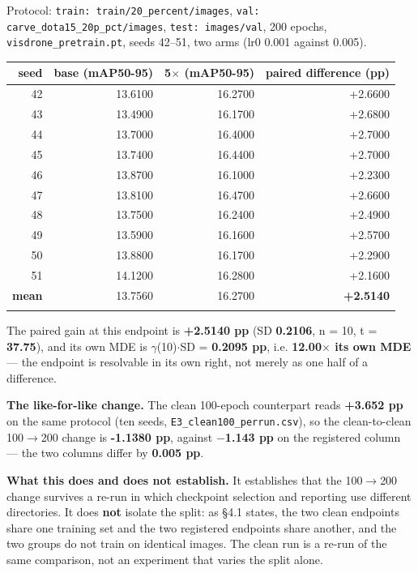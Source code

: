 \documentclass[pdflatex,sn-mathphys-ay]{sn-jnl}
\begin{document}
Protocol: \texttt{train: train/20\_percent/images}, \texttt{val: carve\_dota15\_20p\_pct/images}, \texttt{test: images/val}, 200 epochs, \texttt{visdrone\_pretrain.pt}, seeds 42--51, two arms (lr0 0.001 against 0.005).

\begin{center}
{\small
\begin{tabular}{rrrr}
\toprule
seed & base (mAP50-95) & 5\ensuremath{\times} (mAP50-95) & paired difference (pp) \\
\midrule
42 & 13.6100 & 16.2700 & +2.6600 \\
43 & 13.4900 & 16.1700 & +2.6800 \\
44 & 13.7000 & 16.4000 & +2.7000 \\
45 & 13.7400 & 16.4400 & +2.7000 \\
46 & 13.8700 & 16.1000 & +2.2300 \\
47 & 13.8100 & 16.4700 & +2.6600 \\
48 & 13.7500 & 16.2400 & +2.4900 \\
49 & 13.5900 & 16.1600 & +2.5700 \\
50 & 13.8800 & 16.1700 & +2.2900 \\
51 & 14.1200 & 16.2800 & +2.1600 \\
\textbf{mean} & 13.7560 & 16.2700 & \textbf{+2.5140} \\
\botrule
\end{tabular}}
\end{center}

The paired gain at this endpoint is \textbf{+2.5140 pp} (SD \textbf{0.2106}, n = 10, t = \textbf{37.75}), and its own MDE is \ensuremath{\gamma}(10)\ensuremath{\cdot}SD = \textbf{0.2095 pp}, i.e. \textbf{12.00\ensuremath{\times} its own MDE} --- the endpoint is resolvable in its own right, not merely as one half of a difference.

\textbf{The like-for-like change.} The clean 100-epoch counterpart reads \textbf{+3.652 pp} on the same protocol (ten seeds, \texttt{E3\_clean100\_perrun.csv}), so the clean-to-clean 100\ensuremath{\rightarrow}200 change is \textbf{-1.1380 pp}, against \textbf{\ensuremath{-}1.143 pp} on the registered column --- the two columns differ by \textbf{0.005 pp}.

\textbf{What this does and does not establish.} It establishes that the 100\ensuremath{\rightarrow}200 change survives a re-run in which checkpoint selection and reporting use different directories. It does \textbf{not} isolate the split: as \S{}4.1 states, the two clean endpoints share one training set and the two registered endpoints share another, and the two groups do not train on identical images. The clean run is a re-run of the same comparison, not an experiment that varies the split alone.
\end{document}
